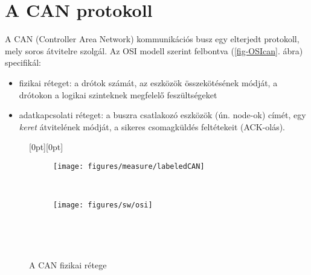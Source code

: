 \section{A CAN protokoll}


	
	A CAN (Controller Area Network) kommunikációs busz egy elterjedt protokoll, mely soros átvitelre szolgál. Az OSI modell szerint felbontva (\ref{fig-OSIcan}. ábra) specifikál:
	
	\begin{itemize}[noitemsep,topsep=0pt,parsep=0pt,partopsep=0pt]
		\item fizikai réteget: a drótok számát, az eszközök összekötésének módját, a drótokon a logikai szinteknek megfelelő feszültségeket
		\item adatkapcsolati réteget: a buszra csatlakozó eszközök (ún. node-ok) címét, egy \textit{keret} átvitelének módját, a sikeres csomagküldés feltétekeit (ACK-olás).


	\end{itemize}
	
	\begin{figure}[H]
		\raisebox{18pt}[0pt][0pt]{
			\begin{subfigure}[t]{0.49\textwidth}
				\centering
				\texttt{[image: figures/measure/labeledCAN]}
			\end{subfigure}
		}
		~
		\begin{subfigure}[t]{0.49\textwidth}
			\centering
			\texttt{[image: figures/sw/osi]}
		\end{subfigure}
		\\
		\begin{minipage}{.49\textwidth}
			\leavevmode{}
			\label{fig-CANwaveform}
		\end{minipage}
		~
		\begin{minipage}{.49\textwidth}
			\leavevmode{}
			\label{fig-OSIcan}
		\end{minipage}
		\caption{A CAN fizikai rétege}
		\label{fig-CANhw}
	\end{figure}
	
